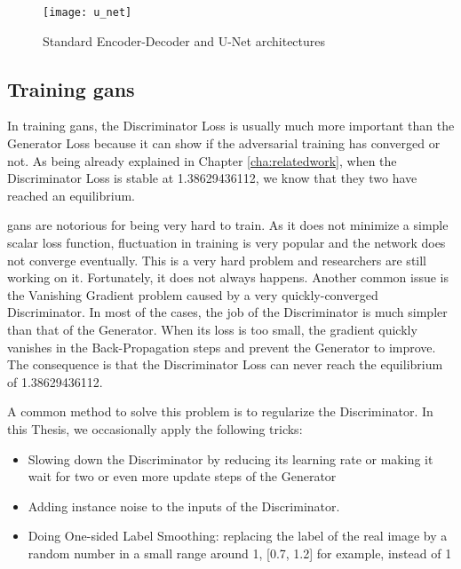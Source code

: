 \begin{figure}[h]
	\centering
	\texttt{[image: u\_net]}
	\caption{Standard Encoder-Decoder and U-Net architectures}
	\label{fig:u_net}
\end{figure}

\subsection{Training \acrshort{gan}s}
\label{sub:training_gan}

In training \acrshort{gan}s, the Discriminator Loss is usually much more important than
the Generator Loss because it can show if the adversarial training has converged or
not. As being already explained in Chapter \ref{cha:relatedwork}, when the Discriminator
Loss is stable at 1.38629436112, we know that they two have reached an equilibrium. 

\acrshort{gan}s are notorious for being very hard to train. As it does not minimize a
simple scalar loss function, fluctuation in training is very popular and the network does
not converge eventually. This is a very hard problem and researchers are still working on
it. Fortunately, it does not always happens. Another common issue is the
Vanishing Gradient problem caused by a very quickly-converged Discriminator. In most of
the cases, the job of the Discriminator is much simpler than that of the Generator. When
its loss is too small, the gradient quickly vanishes in the Back-Propagation steps and
prevent the Generator to improve. The consequence is that the Discriminator Loss can never
reach the equilibrium of 1.38629436112.

A common method to solve this problem is to regularize the Discriminator. In this Thesis, we
occasionally apply the following tricks:

\begin{itemize}
	\item Slowing down the Discriminator by reducing its learning rate or making it wait
		for two or even more update steps of the Generator
	\item Adding instance noise to the inputs of the Discriminator. \cite{kaae}
	\item Doing One-sided Label Smoothing: replacing the label of the real image
		by a random number in a small range around 1, [0.7, 1.2] for example, instead of 1
		\cite{saliman}
\end{itemize}

